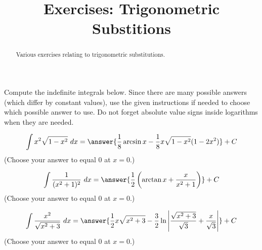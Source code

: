 \documentclass{ximera}
\title{Exercises: Trigonometric Substitions}
\begin{document}
\begin{abstract}
Various exercises relating to trigonometric substitutions.
\end{abstract}
\maketitle


Compute the indefinite integrals below. Since there are many possible answers (which differ by constant values), use the given instructions if needed to choose which possible answer to use. Do not forget absolute value signs inside logarithms when they are needed.

\begin{exercise}%
\[ \int x^2\sqrt{1-x^2}\ dx = \answer{\frac{1}{8}\arcsin x-\frac{1}{8}x\sqrt{1-x^2}(1-2x^2)}+C\] 
(Choose your answer to equal $0$ at $x = 0$.)
%
%
\end{exercise}

\begin{exercise}%
\[  \int \frac {1}{(x^2+1)^2}\ dx = \answer{\frac{1}{2}\left(\arctan x+\frac{x}{x^2+1}\right)} +C\]
(Choose your answer to equal $0$ at $x = 0$.)
%
%
\end{exercise}

\begin{exercise}%
\[  \int \frac{x^2}{\sqrt{x^2+3}}\ dx = \answer{\frac{1}{2}x\sqrt{x^2+3}-\frac{3}{2}\ln\left|\frac{\sqrt{x^2+3}}{\sqrt{3}}+\frac{x}{\sqrt{3}}\right|} +C\]
(Choose your answer to equal $0$ at $x = 0$.)
%
%
\end{exercise}
\end{document}
